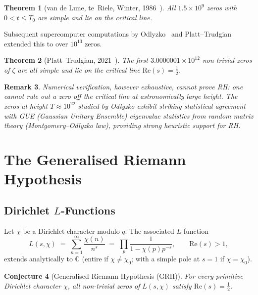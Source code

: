 \documentclass[12pt,a4paper]{article}
\newtheorem{theorem}{Theorem}[section]
\newtheorem{conjecture}[theorem]{Conjecture}
\newtheorem{remark}[theorem]{Remark}
\theoremstyle{remark}
\begin{document}
\begin{theorem}[van de Lune, te~Riele, Winter, 1986~\cite{vanDeLune1986}]
  All $1.5 \times 10^9$ zeros with $0 < t \leq T_0$ are simple and lie on the critical line.
\end{theorem}

Subsequent supercomputer computations by Odlyzko~\cite{Odlyzko2001} and Platt--Trudgian
extended this to over $10^{13}$ zeros.

\begin{theorem}[Platt--Trudgian, 2021~\cite{PlattTrudgian2021}]
  The first $3.0000001 \times 10^{12}$ non-trivial zeros of $\zeta$ are all simple and
  lie on the critical line $\mathrm{Re}(s)=\tfrac{1}{2}$.
\end{theorem}

\begin{remark}
  Numerical verification, however exhaustive, cannot prove RH: one cannot rule out a
  zero off the critical line at astronomically large height.  The zeros at height
  $T \approx 10^{22}$ studied by Odlyzko exhibit striking statistical agreement with
  GUE (Gaussian Unitary Ensemble) eigenvalue statistics from random matrix theory
  (Montgomery--Odlyzko law), providing strong heuristic support for RH.
\end{remark}

\section{The Generalised Riemann Hypothesis}

\subsection{Dirichlet $L$-Functions}

Let $\chi$ be a Dirichlet character modulo $q$.  The associated $L$-function
\[
  L(s,\chi) \;=\; \sum_{n=1}^{\infty} \frac{\chi(n)}{n^s} \;=\; \prod_p \frac{1}{1-\chi(p)p^{-s}},
  \qquad \mathrm{Re}(s)>1,
\]
extends analytically to $\mathbb{C}$ (entire if $\chi\neq\chi_0$; with a simple pole at
$s=1$ if $\chi=\chi_0$).

\begin{conjecture}[Generalised Riemann Hypothesis (GRH)]
  For every primitive Dirichlet character $\chi$, all non-trivial zeros of $L(s,\chi)$
  satisfy $\mathrm{Re}(s)=\tfrac{1}{2}$.
\end{conjecture}
\end{document}
